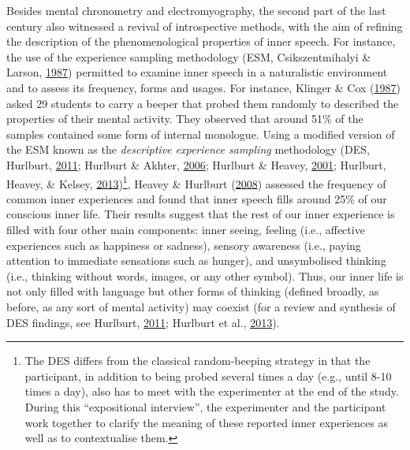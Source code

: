 \documentclass[a4paper,12pt,twoside,openright,oldfontcommands,final]{memoir}
\let\rmarkdownfootnote\footnote%
\def\footnote{\protect\rmarkdownfootnote}
\begin{document}
Besides mental chronometry and electromyography, the second part of the last century also witnessed a revival of introspective methods, with the aim of refining the description of the phenomenological properties of inner speech. For instance, the use of the experience sampling methodology (ESM, Csikszentmihalyi \& Larson, \protect\hyperlink{ref-csikszentmihalyi_validity_1987}{1987}) permitted to examine inner speech in a naturalistic environment and to assess its frequency, forms and usages. For instance, Klinger \& Cox (\protect\hyperlink{ref-klinger_dimensions_1987}{1987}) asked 29 students to carry a beeper that probed them randomly to described the properties of their mental activity. They observed that around 51\% of the samples contained some form of internal monologue. Using a modified version of the ESM known as the \emph{descriptive experience sampling} methodology (DES, Hurlburt, \protect\hyperlink{ref-Hurlburt2011}{2011}; Hurlburt \& Akhter, \protect\hyperlink{ref-hurlburt_descriptive_2006}{2006}; Hurlburt \& Heavey, \protect\hyperlink{ref-Hurlburt2001}{2001}; Hurlburt, Heavey, \& Kelsey, \protect\hyperlink{ref-Hurlburt2013}{2013})\footnote{The DES differs from the classical random-beeping strategy in that the participant, in addition to being probed several times a day (e.g., until 8-10 times a day), also has to meet with the experimenter at the end of the study. During this \enquote{expositional interview}, the experimenter and the participant work together to clarify the meaning of these reported inner experiences as well as to contextualise them.}, Heavey \& Hurlburt (\protect\hyperlink{ref-heavey_phenomena_2008}{2008}) assessed the frequency of common inner experiences and found that inner speech fills around 25\% of our conscious inner life. Their results suggest that the rest of our inner experience is filled with four other main components: inner seeing, feeling (i.e., affective experiences such as happiness or sadness), sensory awareness (i.e., paying attention to immediate sensations such as hunger), and unsymbolised thinking (i.e., thinking without words, images, or any other symbol). Thus, our inner life is not only filled with language but other forms of thinking (defined broadly, as before, as any sort of mental activity) may coexist (for a review and synthesis of DES findings, see Hurlburt, \protect\hyperlink{ref-Hurlburt2011}{2011}; Hurlburt et al., \protect\hyperlink{ref-Hurlburt2013}{2013}).
\end{document}
